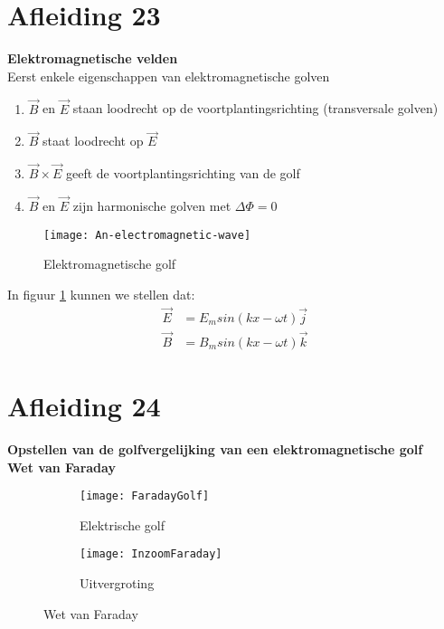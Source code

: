 \documentclass[a4paper,kul]{kulakarticle} %
\begin{document}
\section{Afleiding 23}
\textbf{Elektromagnetische velden}\\
Eerst enkele eigenschappen van elektromagnetische golven
\begin{enumerate}
	\item $\vec{B}$ en $\vec{E}$ staan loodrecht op de voortplantingsrichting (transversale golven)
	\item $\vec{B}$ staat loodrecht op $\vec{E}$
	\item $\vec{B} \times\vec{E}$ geeft de voortplantingsrichting van de golf
	\item $\vec{B}$ en $\vec{E}$ zijn harmonische golven met $\Delta\Phi = 0$
\end{enumerate}
\begin{figure}[h]
	\centering
	\texttt{[image: An-electromagnetic-wave]}
	\caption[Elektromagnetische golf]{Elektromagnetische golf}
	\label{fig:an-electromagnetic-wave}
\end{figure}
In figuur \ref{fig:an-electromagnetic-wave} kunnen we stellen dat:
\begin{align*}
	\vec{E} &= E_msin(kx-\omega t)\vec{j}\\
	\vec{B} &= B_msin(kx-\omega t)\vec{k}
\end{align*}
\newpage
\section{Afleiding 24}
\textbf{Opstellen van de golfvergelijking van een elektromagnetische golf}\\
\textbf{Wet van Faraday}\\
\begin{figure}[h]
	\centering
	\begin{subfigure}{.5\textwidth}
		\centering
		\texttt{[image: FaradayGolf]}
		\caption[Elektrische golf]{Elektrische golf}
		\label{fig:faradaygolf}
	\end{subfigure}%
	\begin{subfigure}{.5\textwidth}
		\centering
		\texttt{[image: InzoomFaraday]}
		\caption[Inzoom Faraday]{Uitvergroting}
		\label{fig:inzoomfaraday}
	\end{subfigure}
	\caption{Wet van Faraday}
	\label{fig:InductieFaraday}
\end{figure}\\
\end{document}
